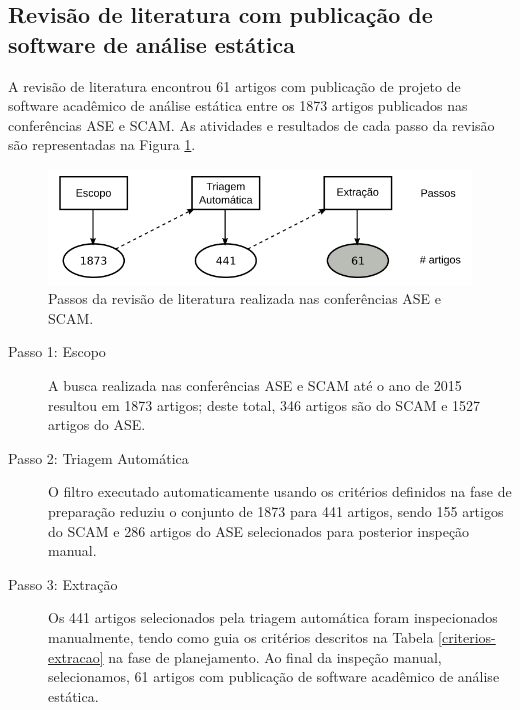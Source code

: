 \subsection{Revisão de literatura com publicação de software de análise estática}

A revisão de literatura encontrou 61 artigos com publicação de projeto de
software acadêmico de análise estática entre os 1873 artigos publicados nas
conferências ASE e SCAM. As atividades e resultados de cada passo da revisão
são representadas na Figura \ref{revisao-literatura}.

\begin{figure}[h]
  \center
  \includegraphics[scale=0.4]{imagens/revisao-literatura.png}
  \caption{Passos da revisão de literatura realizada nas conferências ASE e SCAM.}
  \label{revisao-literatura}
\end{figure}

\begin{description}

  \item [Passo 1: Escopo]

A busca realizada nas conferências ASE e SCAM até o ano de 2015 resultou em
1873 artigos; deste total, 346 artigos são do SCAM e 1527 artigos do ASE.

  \item [Passo 2: Triagem Automática]

O filtro executado automaticamente usando os critérios definidos na fase de
preparação reduziu o conjunto de 1873 para 441 artigos, sendo 155 artigos do SCAM e
286 artigos do ASE selecionados para posterior inspeção manual.

  \item [Passo 3: Extração]

Os 441 artigos selecionados pela triagem automática foram inspecionados manualmente, tendo como guia
os critérios descritos na Tabela \ref{criterios-extracao} na fase de
planejamento. Ao final da inspeção manual, selecionamos, 61 artigos com publicação de
software acadêmico de análise estática.

\end{description}


